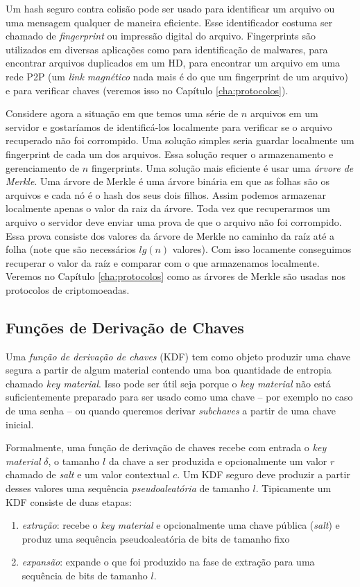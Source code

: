 Um hash seguro contra colisão pode ser usado para identificar um arquivo ou uma mensagem qualquer de maneira eficiente.
Esse identificador costuma ser chamado de {\em fingerprint} ou impressão digital do arquivo.
Fingerprints são utilizados em diversas aplicações como para identificação de malwares, para encontrar arquivos duplicados em um HD, para encontrar um arquivo em uma rede P2P (um {\em link magnético} nada mais é do que um fingerprint de um arquivo) e para verificar chaves (veremos isso no Capítulo \ref{cha:protocolos}).

Considere agora a situação em que temos uma série de $n$ arquivos em um servidor e gostaríamos de identificá-los localmente para verificar se o arquivo recuperado não foi corrompido.
Uma solução simples seria guardar localmente um fingerprint de cada um dos arquivos.
Essa solução requer o armazenamento e gerenciamento de $n$ fingerprints.
Uma solução mais eficiente é usar uma {\em árvore de Merkle}.
Uma árvore de Merkle é uma árvore binária em que as folhas são os arquivos e cada nó é o hash dos seus dois filhos.
Assim podemos armazenar localmente apenas o valor da raiz da árvore.
Toda vez que recuperarmos um arquivo o servidor deve enviar uma prova de que o arquivo não foi corrompido.
Essa prova consiste dos valores da árvore de Merkle no caminho da raíz até a folha (note que são necessários $lg(n)$ valores).
Com isso locamente conseguimos recuperar o valor da raíz e comparar com o que armazenamos localmente.
Veremos no Capítulo \ref{cha:protocolos} como as árvores de Merkle são usadas nos protocolos de criptomoeadas.

\subsection{Funções de Derivação de Chaves}
\label{sec:kdf}

Uma {\em função de derivação de chaves} (KDF) tem como objeto produzir uma chave segura a partir de algum material contendo uma boa quantidade de entropia chamado {\em key material}.
Isso pode ser útil seja porque o {\em key material} não está suficientemente preparado para ser usado como uma chave -- por exemplo no caso de uma senha -- ou quando queremos derivar {\em subchaves} a partir de uma chave inicial.

Formalmente, uma função de derivação de chaves recebe com entrada o {\em key material} $\delta$, o tamanho $l$ da chave a ser produzida e opcionalmente um valor $r$ chamado de {\em salt} e um valor contextual $c$.
Um KDF seguro deve produzir a partir desses valores uma sequência {\em pseudoaleatória} de tamanho $l$.
Tipicamente um KDF consiste de duas etapas: 
\begin{enumerate}
\item {\em extração}: recebe o {\em key material} e opcionalmente uma chave pública ({\em salt}) e produz uma sequência pseudoaleatória de bits de tamanho fixo
\item {\em expansão}: expande o que foi produzido na fase de extração para uma sequência de bits de tamanho $l$.
\end{enumerate}

